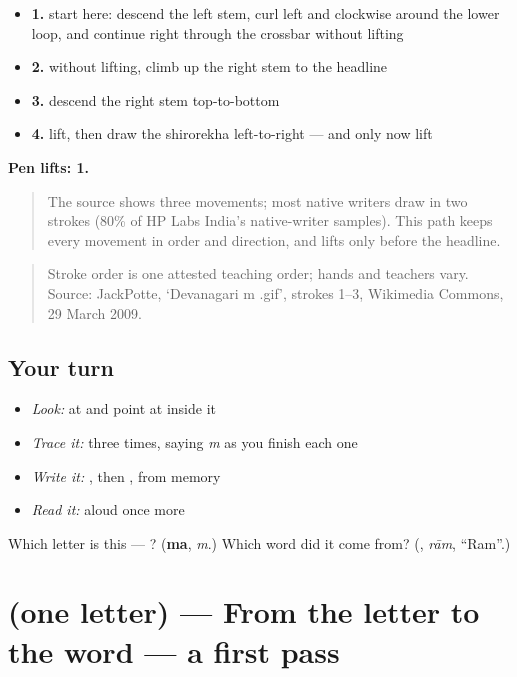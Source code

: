 \begin{itemize}
\raggedright
  \item \textbf{1.} start here: descend the left stem, curl left and clockwise around the lower loop, and continue right through the crossbar without lifting
  \item \textbf{2.} without lifting, climb up the right stem to the headline
  \item \textbf{3.} descend the right stem top-to-bottom
  \item \textbf{4.} lift, then draw the shirorekha left-to-right — and only now lift
\end{itemize}

\textbf{Pen lifts: 1.}

\begin{quote}
The source shows three movements; most native writers draw  in two strokes (80\% of HP Labs India's native-writer samples). This path keeps every movement in order and direction, and lifts only before the headline.
\end{quote}

\begin{quote}
Stroke order is one attested teaching order; hands and teachers vary. Source: JackPotte, ‘Devanagari m .gif’, strokes 1–3, Wikimedia Commons, 29 March 2009.
\end{quote}

\subsection*{Your turn}
\begin{itemize}
\raggedright
  \item \emph{Look:} at \textbf{} and point at  inside it
  \item \emph{Trace it:}  three times, saying \emph{m} as you finish each one
  \item \emph{Write it:} , then , from memory
  \item \emph{Read it:} \textbf{} aloud once more
\end{itemize}

\begin{tcolorbox}[breakable,colback=teal!4,colframe=teal!35!black,title={Before you move on}]
Which letter is this — ? (\textbf{ma}, \emph{m}.) Which word did it come from? (\textbf{}, \emph{rām}, \textquotedblleft{}Ram\textquotedblright{}.)
\end{tcolorbox}
\section[(one letter)]{(one letter) — From the letter to the word — a first pass}

